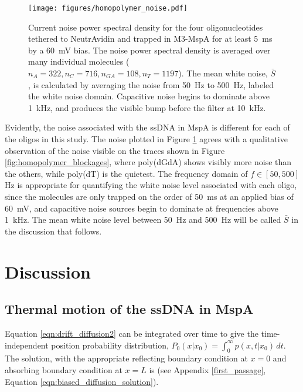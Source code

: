 \begin{figure}[h]
\begin{centering}
\texttt{[image: figures/homopolymer\_noise.pdf]}
\caption[Current fluctuations for all homopolymer ssDNA]{Current noise power spectral density for the four oligonucleotides tethered to NeutrAvidin and trapped in M3-MspA for at least \SI{5}{\ms} by a \SI{60}{\mV} bias.  The noise power spectral density is averaged over many individual molecules ($n_A=322, n_C=716, n_{GA}=108, n_T=1197$).  The mean white noise, $\bar{S}$, is calculated by averaging the noise from \SI{50}{\Hz} to \SI{500}{\Hz}, labeled the white noise domain.  Capacitive noise begins to dominate above \SI{1}{\kHz}, and produces the visible bump before the filter at \SI{10}{\kHz}.}
\label{fig:homopolymer_fluctuations}
\end{centering}
\end{figure}

Evidently, the noise associated with the ssDNA in MspA is different for each of the oligos in this study.  The noise plotted in Figure \ref{fig:homopolymer_fluctuations} agrees with a qualitative observation of the noise visible on the traces shown in Figure \ref{fig:homopolymer_blockages}, where poly(dGdA) shows visibly more noise than the others, while poly(dT) is the quietest.  The frequency domain of $f \in [50, 500]$\si{\Hz} is appropriate for quantifying the white noise level associated with each oligo, since the molecules are only trapped on the order of \SI{50}{\ms} at an applied bias of \SI{60}{\mV}, and capacitive noise sources begin to dominate at frequencies above \SI{1}{\kHz}.  The mean white noise level between \SI{50}{\Hz} and \SI{500}{\Hz} will be called $\bar{S}$ in the discussion that follows.

\section{Discussion}

\subsection{Thermal motion of the ssDNA in MspA}

Equation \ref{eqn:drift_diffusion2} can be integrated over time to give the time-independent position probability distribution, $P_0(x|x_0) = \int_0^{\infty} p(x,t|x_0) \, dt$.  The solution, with the appropriate reflecting boundary condition at $x=0$ and absorbing boundary condition at $x=L$ is (see Appendix \ref{first_passage}, Equation \ref{eqn:biased_diffusion_solution}).

